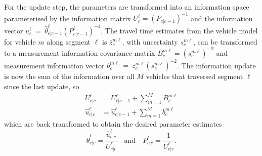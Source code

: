 For the update step, the parameters are transformed into an information
space parameterised by the information matrix $U^\ell_c = (P_{c|c-1})^{-1}$
and the information vector $u^\ell_c~=~\hat \theta^\ell_{c|c-1} (P^\ell_{c|c-1})^{-1}$.
The travel time estimates from the vehicle model for vehicle $m$ along segment $\ell$
is $\bar z_c^{m\ell}$, with uncertainty $s^{m\ell}_c$,
can be transformed to a measurement information covariance matrix 
$B_c^{m\ell} = (s^{m\ell}_c)^{-2}$
and measurement information vector $b_c^{m\ell}~=~\bar z^{m\ell}_c (s^{m\ell}_c)^{-2}$.
The information update is now the sum of the information over all $M$ vehicles
that traversed segment $\ell$ since the last update, so
\begin{align*}
U^\ell_{c|c} &= U^\ell_{c|c-1} + \sum_{m=1}^M B^{m\ell}_{c} \\
\hat u^\ell_{c|c} &= \hat u^\ell_{c|c-1} + \sum_{m=1}^M b^{m\ell}_{c}
\end{align*}
which are back transformed to obtain the desired parameter estimates
\begin{equation*}
\hat \theta^\ell_{c|c} = \frac{\hat u^\ell_{c|c}}{U^\ell_{c|c}} 
\quad\text{and}\quad
P^\ell_{c|c} = \frac{1}{U^\ell_{c|c}}.
\end{equation*}



